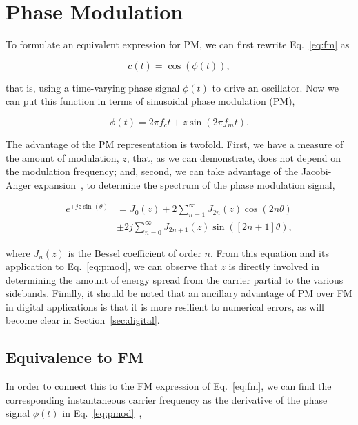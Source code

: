 \documentclass[]{interact}
\begin{document}
\section{Phase Modulation}

To formulate an equivalent expression for PM, we can first rewrite Eq.~\ref{eq:fm} as 

\begin{equation}\label{eq:pm}
c(t) = \cos(\phi(t)),
\end{equation}

\noindent that is, using a time-varying phase signal $\phi(t)$ to drive an oscillator.
Now we can put this function in terms of sinusoidal phase modulation (PM),

\begin{equation}\label{eq:pmod}
\phi(t) =  2\pi f_c t  + z \sin(2\pi f_m t).
\end{equation}

The advantage of the PM representation is twofold. First, we 
have a measure of the amount of modulation, $z$, that, as we can demonstrate, does not depend on the
modulation frequency; and, second, we can take advantage of the Jacobi-Anger 
expansion~\citep[p.22]{Watson}, to determine the spectrum of the phase modulation signal,

\begin{equation}\label{eq:jacobi-anger}
\begin{split}
e^{\pm jz\sin(\theta)}  &= J_{0}(z) + 2 \sum_{n=1}^{\infty} J_{2n}(z)\cos\left(2n\theta\right) \\
& \pm 2j \sum_{n=0}^{\infty} J_{2n+1}(z)\sin\left([2n+1]\theta\right),
\end{split} 
\end{equation}

\noindent where $J_n(z)$ is the Bessel coefficient of order $n$. From this equation and its application
to Eq.~\ref{eq:pmod}, we can observe that $z$ is directly involved in determining the amount of energy spread from
the carrier partial to the various sidebands. Finally, it should be noted that an ancillary advantage of PM over
FM in digital applications is that it is more resilient to numerical errors, as will become clear in Section~\ref{sec:digital}.

\subsection{Equivalence to FM}\label{sec:fmvpm}

In order to connect this to the FM expression of Eq.~\ref{eq:fm}, we can find 
the corresponding instantaneous carrier frequency as the derivative of the phase
signal $\phi(t)$ in Eq.~\ref{eq:pmod}~\citep[p.318]{Moore:1990},
\end{document}
